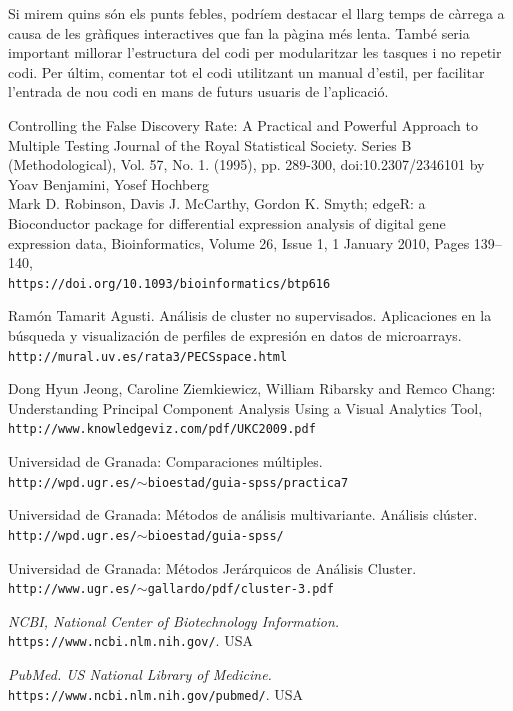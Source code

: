 \documentclass[english]{article}
\begin{document}
Si mirem quins són els punts febles, podríem destacar el llarg temps de càrrega a causa de les gràfiques interactives que fan la pàgina més lenta. També seria important millorar l'estructura del codi per modularitzar les tasques i no repetir codi. Per últim, comentar tot el codi utilitzant un manual d'estil, per facilitar l'entrada de nou codi en mans de futurs usuaris de l'aplicació.
\clearpage
\begin{thebibliography}{9}
Controlling the False Discovery Rate: A Practical and Powerful Approach to Multiple Testing Journal of the Royal Statistical Society. Series B (Methodological), Vol. 57, No. 1. (1995), pp. 289-300, doi:10.2307/2346101 by Yoav Benjamini, Yosef Hochberg
\\
Mark D. Robinson, Davis J. McCarthy, Gordon K. Smyth; edgeR: a Bioconductor package for differential expression analysis of digital gene expression data, Bioinformatics, Volume 26, Issue 1, 1 January 2010, Pages 139–140,
\\\texttt{https://doi.org/10.1093/bioinformatics/btp616}

Ramón Tamarit Agusti. Análisis de cluster no supervisados. Aplicaciones en
la búsqueda y visualización de perfiles de expresión
en datos de microarrays.
\\\texttt{http://mural.uv.es/rata3/PECSspace.html}

Dong Hyun Jeong, Caroline Ziemkiewicz, William Ribarsky and Remco Chang: Understanding Principal Component Analysis Using a Visual Analytics Tool,
\\\texttt{http://www.knowledgeviz.com/pdf/UKC2009.pdf}

Universidad de Granada: Comparaciones múltiples.
\\\texttt{http://wpd.ugr.es/$\sim$bioestad/guia-spss/practica7}

Universidad de Granada: Métodos de análisis multivariante. Análisis clúster.
\\\texttt{http://wpd.ugr.es/$\sim$bioestad/guia-spss/}

Universidad de Granada: Métodos Jerárquicos de Análisis Cluster.
\\\texttt{http://www.ugr.es/$\sim$gallardo/pdf/cluster-3.pdf}

\textit{NCBI, National Center of Biotechnology Information.}
\\\texttt{https://www.ncbi.nlm.nih.gov/}. USA

\textit{PubMed. US National Library of Medicine.}
\\\texttt{https://www.ncbi.nlm.nih.gov/pubmed/}. USA

\end{thebibliography}
\clearpage
\appendix
\onecolumn
\end{document}
